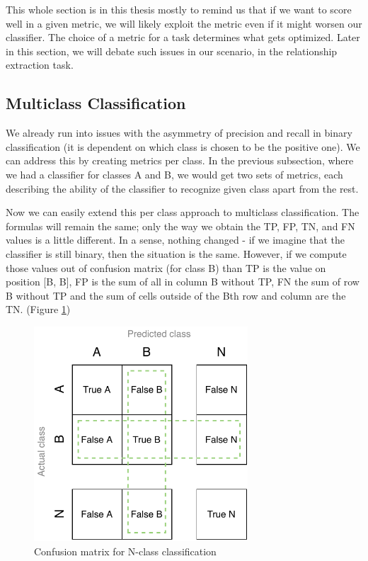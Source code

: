 This whole section is in this thesis mostly to remind us that if we want to score well in a given metric, we will likely exploit the metric even if it might worsen our classifier. The choice of a metric for a task determines what gets optimized. Later in this section, we will debate such issues in our scenario, in the relationship extraction task.





\subsection{Multiclass Classification}


We already run into issues with the asymmetry of precision and recall in binary classification (it is dependent on which class is chosen to be the positive one). We can address this by creating metrics per class. In the previous subsection, where we had a classifier for classes A and B, we would get two sets of metrics, each describing the ability of the classifier to recognize given class apart from the rest.

Now we can easily extend this per class approach to multiclass classification. The formulas will remain the same; only the way we obtain the TP, FP, TN, and FN values is a little different. In a sense, nothing changed - if we imagine that the classifier is still binary, then the situation is the same. However, if we compute those values out of confusion matrix (for class B) than TP is the value on position [B, B], FP is the sum of all in column B without TP, FN the sum of row B without TP and the sum of cells outside of the Bth row and column are the TN. (Figure \ref{obr:BigCM})



\begin{figure}[h]\centering
\includegraphics[width=80mm]{./img//Diplomka diagramy-Big Confusion matric}
\caption{Confusion matrix for N-class classification}
\label{obr:BigCM}
\end{figure}






